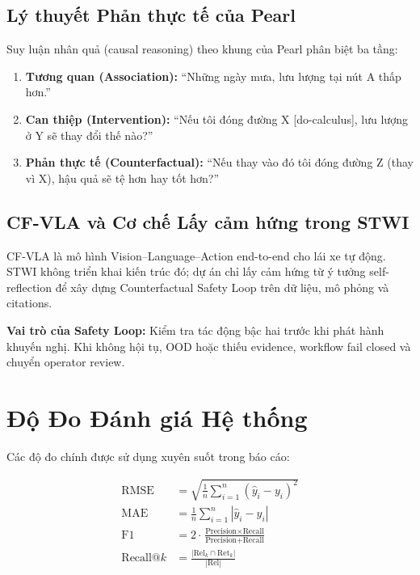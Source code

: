 \subsection{Lý thuyết Phản thực tế của Pearl}

Suy luận nhân quả (causal reasoning) theo khung của Pearl \cite{pearl2018why} phân biệt ba tầng:

\begin{enumerate}[leftmargin=1.5cm, itemsep=4pt]
  \item \textbf{Tương quan (Association):} ``Những ngày mưa, lưu lượng tại nút A thấp hơn.''
  \item \textbf{Can thiệp (Intervention):} ``Nếu tôi đóng đường X [do-calculus], lưu lượng ở Y sẽ thay đổi thế nào?''
  \item \textbf{Phản thực tế (Counterfactual):} ``Nếu thay vào đó tôi đóng đường Z (thay vì X), hậu quả sẽ tệ hơn hay tốt hơn?''
\end{enumerate}

\subsection{CF-VLA và Cơ chế Lấy cảm hứng trong STWI}

CF-VLA là mô hình Vision--Language--Action end-to-end cho lái xe tự động. STWI không triển khai kiến trúc đó; dự án chỉ lấy cảm hứng từ ý tưởng self-reflection để xây dựng Counterfactual Safety Loop trên dữ liệu, mô phỏng và citations.

\begin{tcolorbox}[dangerbox]
\textbf{Vai trò của Safety Loop:} Kiểm tra tác động bậc hai trước khi phát hành khuyến nghị. Khi không hội tụ, OOD hoặc thiếu evidence, workflow fail closed và chuyển operator review.
\end{tcolorbox}

\section{Độ Đo Đánh giá Hệ thống}

Các độ đo chính được sử dụng xuyên suốt trong báo cáo:

\begin{align}
  \text{RMSE} &= \sqrt{\frac{1}{n}\sum_{i=1}^n (\hat{y}_i - y_i)^2} \label{eq:rmse} \\
  \text{MAE}  &= \frac{1}{n}\sum_{i=1}^n |\hat{y}_i - y_i| \label{eq:mae} \\
  \text{F1}   &= 2 \cdot \frac{\text{Precision} \times \text{Recall}}{\text{Precision} + \text{Recall}} \label{eq:f1} \\
  \text{Recall@}k &= \frac{|\text{Rel}_k \cap \text{Ret}_k|}{|\text{Rel}|} \label{eq:recall_k}
\end{align}

